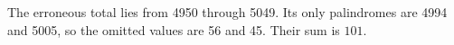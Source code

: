 The erroneous total lies from 4950 through 5049. Its only palindromes are 4994 and 5005, so the omitted values are 56 and 45. Their sum is $\boxed{101}$.

